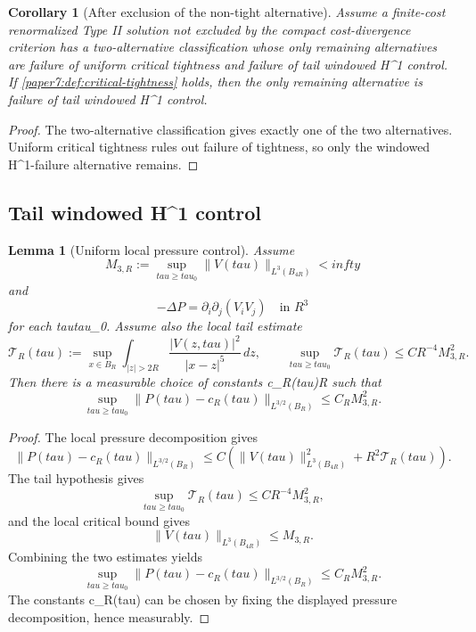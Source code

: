 \documentclass[11pt]{amsart}
\def\({}%
\def\){}%
\def\mathbb#1{#1}%
\def\tau{tau}%
\def\infty{infty}%
\theoremstyle{plain}
\newtheorem{lemma}[lemma]{Lemma}
\newtheorem{corollary}[corollary]{Corollary}
\theoremstyle{definition}
\theoremstyle{remark}
\begin{document}
\begin{corollary}[After exclusion of the non-tight alternative]\label{paper7:cor:critical-tightness-reduces-alternatives}
Assume a finite-cost renormalized Type II solution not excluded by the compact
cost-divergence criterion has a two-alternative classification whose only
remaining alternatives are failure of uniform critical tightness and failure of
tail windowed \(H^1\) control.  If
\cref{paper7:def:critical-tightness} holds, then the only remaining alternative is
failure of tail windowed \(H^1\) control.
\end{corollary}

\begin{proof}
The two-alternative classification gives exactly one of the two alternatives.  Uniform
critical tightness rules out failure of tightness, so only the windowed
\(H^1\)-failure alternative remains.
\end{proof}

\subsection{\texorpdfstring{Tail windowed \(H^1\) control}{Tail windowed H1 control}}

\begin{lemma}[Uniform local pressure control]\label{paper7:lem:uniform-pressure-from-c3}
Assume
\[
  M_{3,R}:=\sup_{\tau\ge\tau_0}\|V(\tau)\|_{L^3(B_{4R})}<\infty
\]
and
\[
  -\Delta P=\partial_i\partial_j(V_iV_j)
  \quad\text{in }\mathbb R^3
\]
for each \(\tau\ge\tau_0\).  Assume also the local tail estimate
\[
  \mathcal T_R(\tau):=
  \sup_{x\in B_R}\int_{|z|>2R}
  \frac{|V(z,\tau)|^2}{|x-z|^5}\,dz,
  \qquad
  \sup_{\tau\ge\tau_0}\mathcal T_R(\tau)\le CR^{-4}M_{3,R}^2 .
\]
Then there is a measurable choice of constants \(c_R(\tau)\in\mathbb R\) such
that
\[
  \sup_{\tau\ge\tau_0}
  \|P(\tau)-c_R(\tau)\|_{L^{3/2}(B_R)}
  \le C_RM_{3,R}^2 .
\]
\end{lemma}

\begin{proof}
The local pressure decomposition gives
\[
  \|P(\tau)-c_R(\tau)\|_{L^{3/2}(B_R)}
  \le
  C\left(
  \|V(\tau)\|_{L^3(B_{4R})}^2+R^2\mathcal T_R(\tau)
  \right).
\]
The tail hypothesis gives
\[
  \sup_{\tau\ge\tau_0}\mathcal T_R(\tau)\le CR^{-4}M_{3,R}^2,
\]
and the local critical bound gives
\[
  \|V(\tau)\|_{L^3(B_{4R})}\le M_{3,R}.
\]
Combining the two estimates yields
\[
  \sup_{\tau\ge\tau_0}
  \|P(\tau)-c_R(\tau)\|_{L^{3/2}(B_R)}
  \le C_RM_{3,R}^2 .
\]
The constants \(c_R(\tau)\) can be chosen by fixing the displayed pressure
decomposition, hence measurably.
\end{proof}
\end{document}
